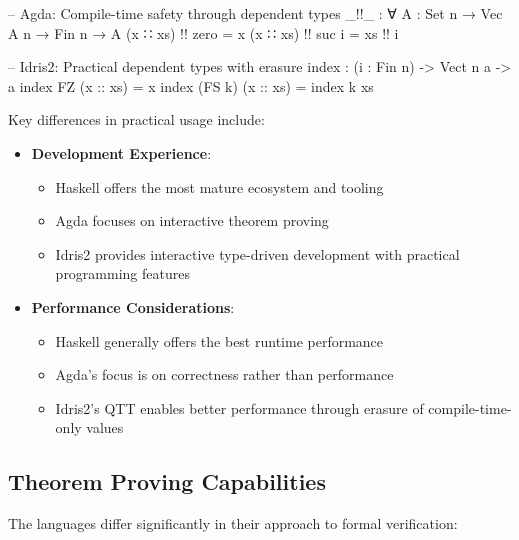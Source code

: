 \documentclass[]{rptuseminar}
\begin{document}
\begin{agda}
-- Agda: Compile-time safety through dependent types  
_!!_ : ∀ {A : Set} {n} → Vec A n → Fin n → A  
(x ∷ xs) !! zero  = x  
(x ∷ xs) !! suc i = xs !! i  
\end{agda}

\begin{idris}  
-- Idris2: Practical dependent types with erasure  
index : (i : Fin n) -> Vect n a -> a  
index FZ     (x :: xs) = x  
index (FS k) (x :: xs) = index k xs  
\end{idris}  

Key differences in practical usage include:  
\begin{itemize}  
    \item \textbf{Development Experience}:  
        \begin{itemize}  
            \item Haskell offers the most mature ecosystem and tooling  
            \item Agda focuses on interactive theorem proving  
            \item Idris2 provides interactive type-driven development with practical programming features  
        \end{itemize}  
    
    \item \textbf{Performance Considerations}:  
        \begin{itemize}  
            \item Haskell generally offers the best runtime performance  
            \item Agda's focus is on correctness rather than performance  
            \item Idris2's QTT enables better performance through erasure of compile-time-only values  
        \end{itemize}  
\end{itemize}  

\subsection{Theorem Proving Capabilities}  
The languages differ significantly in their approach to formal verification:  
\end{document}

